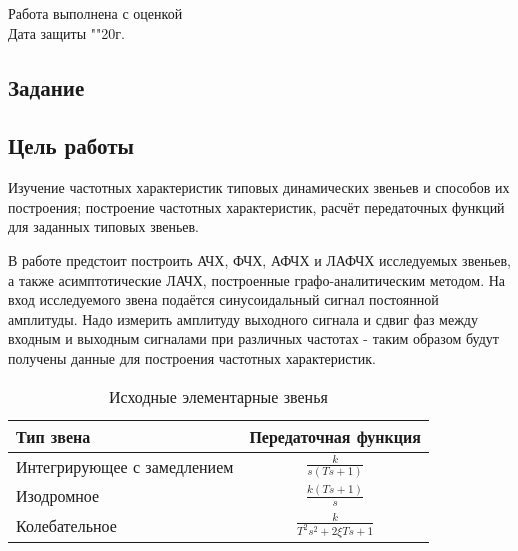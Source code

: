 \documentclass[a4paper, 11pt]{article}
\begin{document}
\begin{titlepage}
		Работа выполнена с оценкой \hspace{1cm} \underline{\hspace{8cm}} \\ 
		\vspace{1cm}
		Дата защиты "\underline{\hspace{0.7cm}}"\hspace{0.2cm}\underline{\hspace{2cm}}\hspace{0.2cm}20\underline{\hspace{0.7cm}}г.

\end{titlepage}

\begin{center}
\section*{Задание}
\end{center}

\subsection*{Цель работы} 
\par
Изучение частотных характеристик типовых динамических звеньев и способов их построения; построение частотных характеристик, расчёт передаточных функций для заданных типовых звеньев.
\par
В работе предстоит построить АЧХ, ФЧХ, АФЧХ и ЛАФЧХ исследуемых звеньев, а также асимптотические ЛАЧХ, построенные графо-аналитическим методом. На вход исследуемого звена подаётся синусоидальный сигнал постоянной амплитуды. Надо измерить амплитуду выходного сигнала и сдвиг фаз между входным и выходным сигналами при различных частотах - таким образом будут получены данные для построения частотных характеристик. 

\begin{table}[h!]

    \begin{threeparttable}
    	\caption{Исходные элементарные звенья}
    	\begin{tabular} {|l|c|}
        \hline
        	Тип звена & Передаточная функция \\ [0.5cm]  \hline
        	Интегрирующее с замедлением & $\displaystyle\frac{k}{s(Ts + 1)}$ \\ [0.5cm]  \hline
        	Изодромное & $\displaystyle\frac{k(Ts + 1)}{s}$ \\ [0.5cm]  \hline
        	Колебательное & $\displaystyle\frac{k}{T^2s^2 + 2{\xi}Ts + 1}$ \\ [0.5cm] \hline
    	\end{tabular}
    \end{threeparttable} 
\end{table}
\end{document}
